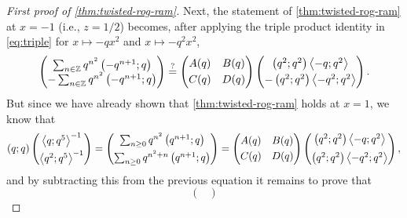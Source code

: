 \documentclass[reqno,11pt]{amsart}
\theoremstyle{definition}
\theoremstyle{remark}
\numberwithin{equation}{section}
\newcommand{\Z}{\mathbb{Z}}
\newcommand{\la}{\left\langle}
\newcommand{\ra}{\right\rangle}
\begin{document}
\begin{proof}[First proof of \cref{thm:twisted-rog-ram}]
Next, the statement of \cref{thm:twisted-rog-ram} at $x = -1$ (i.e., $z = 1/2$) becomes, after applying the triple product identity in \cref{eq:triple} for $x \mapsto -qx^2$ and $x \mapsto -q^2x^2$,
\[
    \begin{pmatrix}
    \sum_{n \in \Z} q^{n^2} \left(-q^{n+1}; q\right)
    \\
    -\sum_{n \in \Z} q^{n^2} \left(-q^{n+1}; q\right)
    \end{pmatrix}
    \stackrel{?}{=}
    \begin{pmatrix}
    A(q) & B(q) \vspace{0.1cm}\\
    C(q) & D(q)
    \end{pmatrix}
    \begin{pmatrix}
    \left(q^2; q^2\right)\la -q; q^2 \ra\vspace{0.1cm} \\
    -\left(q^2; q^2\right)\la -q^2; q^2 \ra
    \end{pmatrix}.
\]
But since we have already shown that \cref{thm:twisted-rog-ram} holds at $x = 1$, we know that
\begin{equation} \label{eq:5-and-10}
    (q; q)
    \begin{pmatrix}
    \la q; q^5 \ra^{-1} \vspace{0.1cm} \\ 
    \la q^2; q^5 \ra^{-1}
    \end{pmatrix}
    =
    \begin{pmatrix}
    \sum_{n \ge 0} q^{n^2}\left(q^{n+1}; q\right) \vspace{0.1cm} \\ 
    \sum_{n \ge 0} q^{n^2 + n}\left(q^{n+1}; q\right)
    \end{pmatrix}
    =
    \begin{pmatrix}
    A(q) & B(q) \vspace{0.1cm}\\
    C(q) & D(q)
    \end{pmatrix}
    \begin{pmatrix}
    \left(q^2; q^2\right)\la -q; q^2 \ra\vspace{0.1cm}\vspace{0.1cm} \\
    \left(q^2; q^2\right)\la -q^2; q^2 \ra
    \end{pmatrix},
\end{equation}
and by subtracting this from the previous equation it remains to prove that
\[
    \begin{pmatrix}

\end{pmatrix}\]
\end{proof}
\end{document}
